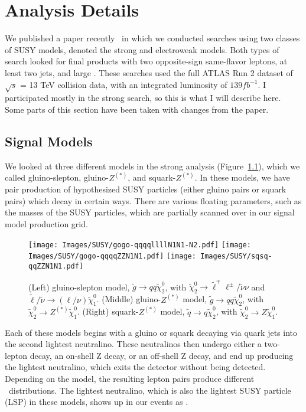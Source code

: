 \chapter{Analysis Details}

We published a paper recently~\cite{SUSY_2l2j} in which we conducted searches using two classes of SUSY models, denoted the strong and electroweak models. Both types of search looked for final products with two opposite-sign same-flavor leptons, at least two jets, and large \MET. These searches used the full ATLAS Run 2 dataset of $\sqrt{s}$ = 13 TeV collision data, with an integrated luminosity of $139 fb^{-1}$. I participated mostly in the strong search, so this is what I will describe here. Some parts of this section have been taken with changes from the paper.

\section{Signal Models}

We looked at three different models in the strong analysis (Figure~\ref{fig:SUSY_models}), which we called gluino-slepton, gluino-$Z^{(*)}$, and squark-$Z^{(*)}$. In these models, we have pair production of hypothesized SUSY particles (either gluino pairs or squark pairs) which decay in certain ways. There are various floating parameters, such as the masses of the SUSY particles, which are partially scanned over in our signal model production grid.

\begin{figure}[htbp]
    \centering
    \texttt{[image: Images/SUSY/gogo-qqqqllllN1N1-N2.pdf]}
    \texttt{[image: Images/SUSY/gogo-qqqqZZN1N1.pdf]}
    \texttt{[image: Images/SUSY/sqsq-qqZZN1N1.pdf]}
    \caption{(Left) gluino-slepton model, $\tilde{g}\to qq \tilde{\chi}_2^0$, with $\tilde{\chi}_{2}^{0} \to \tilde{\ell}^{\mp}\ell^{\pm} / \tilde{\nu}\nu$ and $\tilde{\ell}/\tilde{\nu} \to (\ell/\nu)\tilde{\chi}_{1}^{0}$. (Middle) gluino-$Z^{(*)}$ model, $\tilde{g}\to qq \tilde{\chi}_2^0$, with $\tilde{\chi}_2^0\rightarrow Z^{(*)} \tilde{\chi}_1^0$. (Right) squark-$Z^{(*)}$ model, $\tilde{q}\to q \tilde{\chi}_2^0$, with $\tilde{\chi}_2^0\rightarrow Z \tilde{\chi}_1^0$.}
    \label{fig:SUSY_models}
\end{figure}

Each of these models begins with a gluino or squark decaying via quark jets into the second lightest neutralino. These neutralinos then undergo either a two-lepton decay, an on-shell Z decay, or an off-shell Z decay, and end up producing the lightest neutralino, which exits the detector without being detected. Depending on the model, the resulting lepton pairs produce different \mll\ distributions. The lightest neutralino, which is also the lightest SUSY particle (LSP) in these models, shows up in our events as \MET.

